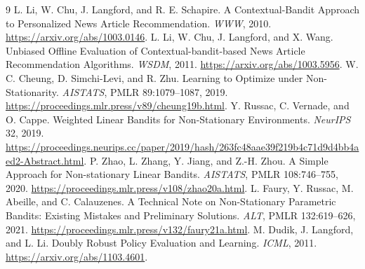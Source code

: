 \documentclass[10pt,a4paper]{article}
\begin{document}
\begin{thebibliography}{9}\footnotesize\setlength{\itemsep}{2pt}\setlength{\parskip}{0pt}
 L. Li, W. Chu, J. Langford, and R. E. Schapire.
A Contextual-Bandit Approach to Personalized News Article Recommendation.
\emph{WWW}, 2010. \url{https://arxiv.org/abs/1003.0146}.
 L. Li, W. Chu, J. Langford, and X. Wang.
Unbiased Offline Evaluation of Contextual-bandit-based News Article
Recommendation Algorithms. \emph{WSDM}, 2011. \url{https://arxiv.org/abs/1003.5956}.
 W. C. Cheung, D. Simchi-Levi, and R. Zhu.
Learning to Optimize under Non-Stationarity. \emph{AISTATS}, PMLR
89:1079--1087, 2019. \url{https://proceedings.mlr.press/v89/cheung19b.html}.
 Y. Russac, C. Vernade, and O. Cappe.
Weighted Linear Bandits for Non-Stationary Environments.
\emph{NeurIPS} 32, 2019. \url{https://proceedings.neurips.cc/paper/2019/hash/263fc48aae39f219b4c71d9d4bb4aed2-Abstract.html}.
 P. Zhao, L. Zhang, Y. Jiang, and Z.-H. Zhou.
A Simple Approach for Non-stationary Linear Bandits. \emph{AISTATS},
PMLR 108:746--755, 2020. \url{https://proceedings.mlr.press/v108/zhao20a.html}.
 L. Faury, Y. Russac, M. Abeille, and C. Calauzenes.
A Technical Note on Non-Stationary Parametric Bandits: Existing Mistakes
and Preliminary Solutions. \emph{ALT}, PMLR 132:619--626, 2021.
\url{https://proceedings.mlr.press/v132/faury21a.html}.
 M. Dudik, J. Langford, and L. Li.
Doubly Robust Policy Evaluation and Learning. \emph{ICML}, 2011.
\url{https://arxiv.org/abs/1103.4601}.
\end{thebibliography}

\clearpage\appendix
\end{document}
